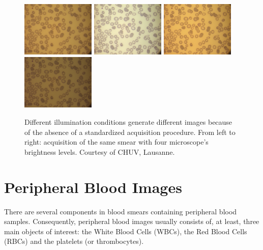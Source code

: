 \documentclass[final,a4paper,12pt,english]{UnicaPhdThesis3}
\begin{document}
\begin{figure}[!b]
	\centering	
	\includegraphics[width=3.5cm]{images/malaria/f1a}
	\includegraphics[width=3.5cm]{images/malaria/f1b}
	\includegraphics[width=3.5cm]{images/malaria/f1c}
	\includegraphics[width=3.5cm]{images/malaria/f1d}
	\caption{\label{fig:images_types} Different illumination conditions generate different images because of the absence of a standardized acquisition procedure. From left to right: acquisition of the same smear with four microscope's brightness levels. Courtesy of CHUV, Lausanne.}
	
\end{figure}

\section{Peripheral Blood Images}
There are several components in blood smears containing peripheral blood samples. Consequently, peripheral blood images usually consists of, at least, three main objects of interest: the White Blood Cells (\acs{WBC}s), the Red Blood Cells (\acs{RBC}s) and the platelets (or thrombocytes). 
\end{document}
